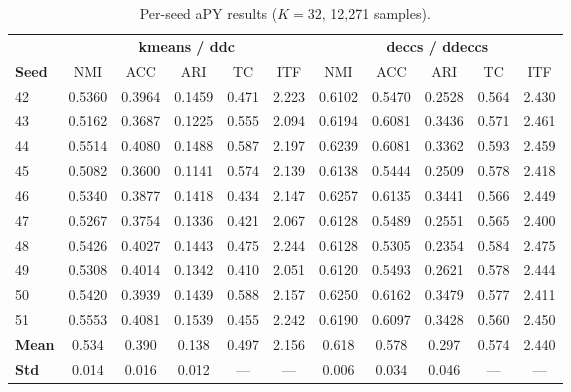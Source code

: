 \begin{table}[H]
    \centering
    \footnotesize
    \setlength{\tabcolsep}{4pt}
    \caption[Per-seed aPY 32-class results]{Per-seed aPY results ($K = 32$, 12{,}271 samples).}
    \label{tab:apy_perseed}
    \begin{tabular}{lccccc|ccccc}
        \hline
        & \multicolumn{5}{c|}{\textbf{kmeans / ddc}} & \multicolumn{5}{c}{\textbf{deccs / ddeccs}} \\
        \textbf{Seed} & NMI & ACC & ARI & TC & ITF & NMI & ACC & ARI & TC & ITF \\
        \hline
        42 & 0.5360 & 0.3964 & 0.1459 & 0.471 & 2.223 & 0.6102 & 0.5470 & 0.2528 & 0.564 & 2.430 \\
        43 & 0.5162 & 0.3687 & 0.1225 & 0.555 & 2.094 & 0.6194 & 0.6081 & 0.3436 & 0.571 & 2.461 \\
        44 & 0.5514 & 0.4080 & 0.1488 & 0.587 & 2.197 & 0.6239 & 0.6081 & 0.3362 & 0.593 & 2.459 \\
        45 & 0.5082 & 0.3600 & 0.1141 & 0.574 & 2.139 & 0.6138 & 0.5444 & 0.2509 & 0.578 & 2.418 \\
        46 & 0.5340 & 0.3877 & 0.1418 & 0.434 & 2.147 & 0.6257 & 0.6135 & 0.3441 & 0.566 & 2.449 \\
        47 & 0.5267 & 0.3754 & 0.1336 & 0.421 & 2.067 & 0.6128 & 0.5489 & 0.2551 & 0.565 & 2.400 \\
        48 & 0.5426 & 0.4027 & 0.1443 & 0.475 & 2.244 & 0.6128 & 0.5305 & 0.2354 & 0.584 & 2.475 \\
        49 & 0.5308 & 0.4014 & 0.1342 & 0.410 & 2.051 & 0.6120 & 0.5493 & 0.2621 & 0.578 & 2.444 \\
        50 & 0.5420 & 0.3939 & 0.1439 & 0.588 & 2.157 & 0.6250 & 0.6162 & 0.3479 & 0.577 & 2.411 \\
        51 & 0.5553 & 0.4081 & 0.1539 & 0.455 & 2.242 & 0.6190 & 0.6097 & 0.3428 & 0.560 & 2.450 \\
        \hline
        \textbf{Mean} & 0.534 & 0.390 & 0.138 & 0.497 & 2.156 & 0.618 & 0.578 & 0.297 & 0.574 & 2.440 \\
        \textbf{Std} & 0.014 & 0.016 & 0.012 & --- & --- & 0.006 & 0.034 & 0.046 & --- & --- \\
        \hline
    \end{tabular}
\end{table}

